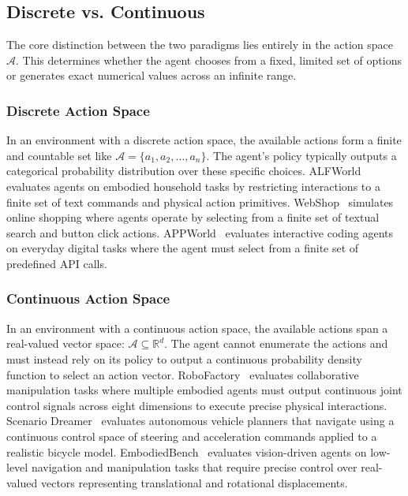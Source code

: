\subsection{Discrete vs. Continuous}
\label{attribute:Discrete vs. Continuous}
The core distinction between the two paradigms lies entirely in the action space $\mathcal{A}$. This determines whether the agent chooses from a fixed, limited set of options or generates exact numerical values across an infinite range.

\subsubsection{Discrete Action Space}
In an environment with a discrete action space, the available actions form a finite and countable set like $\mathcal{A} = \{a_1, a_2, \dots, a_n\}$. The agent's policy typically outputs a categorical probability distribution over these specific choices. ALFWorld~\cite{ALFWorld} evaluates agents on embodied household tasks by restricting interactions to a finite set of text commands and physical action primitives. WebShop~\cite{WebShop} simulates online shopping where agents operate by selecting from a finite set of textual search and button click actions. APPWorld~\cite{AppWorld2024} evaluates interactive coding agents on everyday digital tasks where the agent must select from a finite set of predefined API calls.

\subsubsection{Continuous Action Space}
In an environment with a continuous action space, the available actions span a real-valued vector space: $\mathcal{A} \subseteq \mathbb{R}^d$. The agent cannot enumerate the actions and must instead rely on its policy to output a continuous probability density function to select an action vector. RoboFactory~\cite{RoboFactory} evaluates collaborative manipulation tasks where multiple embodied agents must output continuous joint control signals across eight dimensions to execute precise physical interactions. Scenario Dreamer~\cite{Scenario_Dreamer} evaluates autonomous vehicle planners that navigate using a continuous control space of steering and acceleration commands applied to a realistic bicycle model. EmbodiedBench~\cite{EmbodiedBench} evaluates vision-driven agents on low-level navigation and manipulation tasks that require precise control over real-valued vectors representing translational and rotational displacements.





